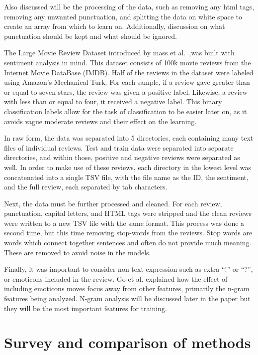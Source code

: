 \documentclass[journal]{IEEEtran}
\begin{document}
Also discussed will be the processing of the data, such as removing any html tags, removing any unwanted punctuation,  and splitting the data on white space to create an array from which to learn on. Additionally, discussion on what punctuation should be kept and what should be ignored.

The Large Movie Review Dataset introduced by mass et al.~\cite{maas-EtAl:2011:ACL-HLT2011},was built with sentiment analysis in mind. This dataset consists of 100k movie reviews from the Internet Movie DataBase (IMDB). Half of the reviews in the dataset were labeled using Amazon’s Mechanical Turk. For each sample, if a review gave greater than or equal to seven stars, the review was given a positive label. Likewise, a review with less than or equal to four, it received a negative label. This binary classification labels allow for the task of classification to be easier later on, as it avoids vague moderate reviews and their effect on the learning.

In raw form, the data was separated into 5 directories, each containing many text files of individual reviews. Test and train data were separated into separate directories, and within those, positive and negative reviews were separated as well. In order to make use of these reviews, each directory in the lowest level was concatenated into a single TSV file, with the file name as the ID, the sentiment, and the full review, each separated by tab characters. 

Next, the data must be further processed and cleaned. For each review, punctuation, capital letters, and HTML tags were stripped and the clean reviews were written to a new TSV file with the same format. This process was done a second time, but this time removing stop-words from the reviews. Stop words are words which connect together sentences and often do not provide much meaning. These are removed to avoid noise in the models.

Finally, it was important to consider non text expression such as extra “!” or “?”, or emoticons included in the review. Go et al. \cite{twitDistSup} explained how the effect of including emoticons moves focus away from other features, primarily the n-gram features being analyzed. N-gram analysis will be discussed later in the paper but they will be the most important features for training. 


\section{Survey and comparison of methods}
\end{document}
